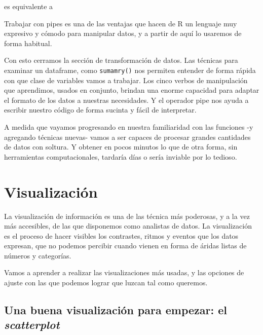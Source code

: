 \documentclass[]{book}
\newenvironment{Shaded}{\begin{snugshade}}{\end{snugshade}}
\newcommand{\KeywordTok}[1]{\textcolor[rgb]{0.13,0.29,0.53}{\textbf{#1}}}
\newcommand{\DecValTok}[1]{\textcolor[rgb]{0.00,0.00,0.81}{#1}}
\newcommand{\StringTok}[1]{\textcolor[rgb]{0.31,0.60,0.02}{#1}}
\newcommand{\OperatorTok}[1]{\textcolor[rgb]{0.81,0.36,0.00}{\textbf{#1}}}
\newcommand{\NormalTok}[1]{#1}
\begin{document}
es equivalente a

\begin{Shaded}
\end{Shaded}

Trabajar con pipes es una de las ventajas que hacen de R un lenguaje muy
expresivo y cómodo para manipular datos, y a partir de aquí lo usaremos
de forma habitual.

Con esto cerramos la sección de transformación de datos. Las técnicas
para examinar un dataframe, como \texttt{sumamry()} nos permiten
entender de forma rápida con que clase de variables vamos a trabajar.
Los cinco verbos de manipulación que aprendimos, usados en conjunto,
brindan una enorme capacidad para adaptar el formato de los datos a
nuestras necesidades. Y el operador pipe nos ayuda a escribir nuestro
código de forma sucinta y fácil de interpretar.

A medida que vayamos progresando en nuestra familiaridad con las
funciones -y agregando técnicas nuevas- vamos a ser capaces de procesar
grandes cantidades de datos con soltura. Y obtener en pocos minutos lo
que de otra forma, sin herramientas computacionales, tardaría días o
sería inviable por lo tedioso.

\chapter{Visualización}\label{visualizacion}

La visualización de información es una de las técnica más poderosas, y a
la vez más accesibles, de las que disponemos como analistas de datos. La
visualización es el proceso de hacer visibles los contrastes, ritmos y
eventos que los datos expresan, que no podemos percibir cuando vienen en
forma de áridas listas de números y categorías.

Vamos a aprender a realizar las visualizaciones más usadas, y las
opciones de ajuste con las que podemos lograr que luzcan tal como
queremos.

\section{\texorpdfstring{Una buena visualización para empezar: el
\emph{scatterplot}}{Una buena visualización para empezar: el scatterplot}}\label{una-buena-visualizacion-para-empezar-el-scatterplot}
\end{document}
